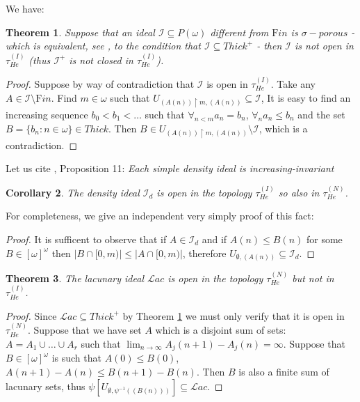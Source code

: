\documentclass[12pt]{amsart}
\theoremstyle{plain}
\newtheorem{theorem}{Theorem}[section]
\newtheorem{corollary}[theorem]{Corollary}
\theoremstyle{definition}
\theoremstyle{remark}
\newcommand{\incrbaire}{\omega^{\omega \uparrow}}
\newcommand{\infsub}{[\omega]^{\omega}}
\newcommand{\inversepsi}{\psi^{-1}}
\newcommand{\calI}{\mathcal{I}}
\newcommand{\idealGestosciowy}{\mathcal{I}_d}
\newcommand{\idealLacunary}{\mathcal{L}\mathit{ac}}
\newcommand{\idealFin}{{\mathrm Fin}}
\newcommand{\Thick}{{\mathit Thick}}
\newcommand{\ThickPlus}{{\Thick}^+}
\newcommand{\Hechler}[2]{U_{#1,#2}}
\newcommand{\HechlerNative}{\tau_{\mathit{He}}^{(N)}}
\newcommand{\HechlerInduced}{\tau_{\mathit{He}}^{(I)}}
\newcommand{\ffid}{\inversepsi}
\begin{document}
We have:
\begin{theorem}\label{sigma-porous-is-not-Hechler-open}
  Suppose that an ideal $\calI \subseteq P(\omega)$ different from $\idealFin$
  is $\sigma-porous$ - which is equivalent, see \cite{KlingaNowikWasik2025}, to
  the condition that $\calI \subseteq \ThickPlus$ - then $\calI$
  is not open in $\HechlerInduced$ (thus $\calI^+$ is not closed in $\HechlerInduced$).
\end{theorem}
\begin{proof}
  Suppose by way of contradiction that
  $\calI$ is open in $\HechlerInduced$.
  Take any $A \in \calI \setminus \idealFin$.
  Find $m \in \omega$ such that
  $\Hechler{(A(n)) \restriction m}{(A(n))} \subseteq \calI$,   
  It is easy to find
  an increasing sequence  $b_0 < b_1 < \ldots$
  such that
$\forall_{n < m} a_n = b_n$, 
  $\forall_{n} a_n \leq b_n$ and the set
  $B = \lbrace b_n \colon n \in \omega\rbrace \in \Thick$.
  Then $B \in \Hechler{(A(n)) \restriction m}{(A(n))} \setminus \calI$,
  which is a contradiction.
\end{proof}

Let us cite \cite{KwelaPoplawskiSwaczynaTryba2019}, Proposition 11:
{\it Each simple density ideal is increasing-invariant}

\begin{corollary}
  The density ideal $\idealGestosciowy$ is open in the
  topology $\HechlerInduced$ so also in $\HechlerNative$.
\end{corollary}

  For completeness, we give an independent very simply proof of this fact:
\begin{proof}
  It is sufficent to observe that if $A \in \idealGestosciowy$
and if $A(n) \leq B(n)$ for some $B \in \infsub$
then $|B \cap [0, m)| \leq |A \cap [0, m)|$, therefore
$\Hechler{\emptyset}{(A(n))} \subseteq \idealGestosciowy$.
\end{proof}

\begin{theorem}
  The lacunary ideal $\idealLacunary$ is open in the topology
$\HechlerNative$ but not in $\HechlerInduced$.  
\end{theorem}

\begin{proof}
  Since $\idealLacunary \subseteq \ThickPlus$ by Theorem \ref{sigma-porous-is-not-Hechler-open}
we must only verify that it is open in $\HechlerNative$. Suppose that
we have set $A$ which is a disjoint sum of sets: $A = A_1 \cup\ldots\cup A_r$
such that $\lim_{n\to\infty} A_j(n + 1) - A_j(n) = \infty$.
Suppose that $B \in \infsub$ is such that
$A(0) \leq B(0)$, $A(n + 1) - A(n) \leq B(n + 1) - B(n)$.
Then $B$ is also a finite sum of lacunary sets,
thus $\psi[\Hechler{\emptyset}{\ffid((B(n)))}] \subseteq \idealLacunary$.
\end{proof}
\end{document}

